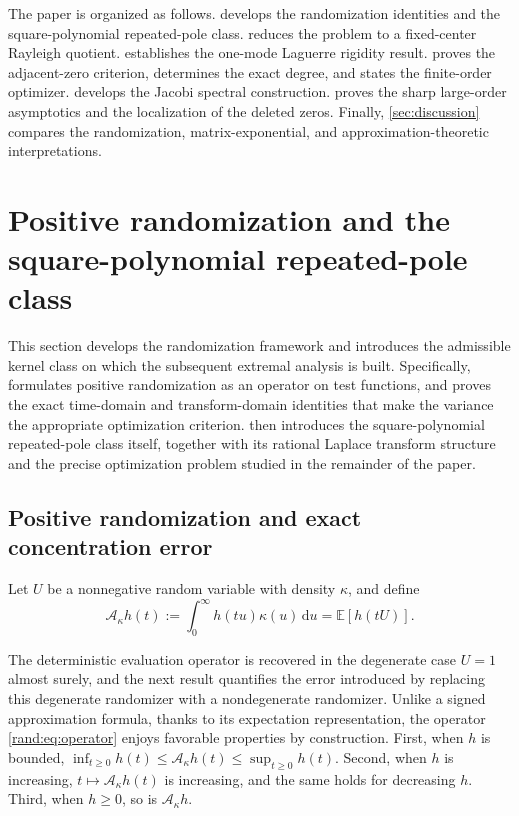 \documentclass[11pt]{article}
\numberwithin{equation}{section}
\theoremstyle{definition}
\theoremstyle{remark}
\newcommand{\E}{\mathbb E}
\newcommand{\dd}{\,\mathrm d}
\newcommand{\Aop}{\mathcal A}
\begin{document}
The paper is organized as follows.
 develops the randomization identities and the
square-polynomial repeated-pole class.
 reduces the problem to a fixed-center Rayleigh
quotient.
 establishes the one-mode Laguerre rigidity
result.
 proves the adjacent-zero criterion, determines the exact
degree, and states the finite-order optimizer.
 develops the Jacobi spectral construction.
 proves the sharp large-order asymptotics and the
localization of the deleted zeros.
Finally, \cref{sec:discussion} compares the randomization,
matrix-exponential, and approximation-theoretic interpretations.








\section{Positive randomization and the square-polynomial repeated-pole class}\label{sec:foundations}

This section develops the randomization framework and introduces the admissible kernel class on which the subsequent extremal analysis is built. Specifically,  formulates positive randomization as an
operator on test functions, and proves the exact time-domain and
transform-domain identities that make the variance the appropriate optimization
criterion.  then introduces the
square-polynomial repeated-pole class itself, together with its rational
Laplace transform structure and the precise optimization problem studied
in the remainder of the paper.

\subsection{Positive randomization and exact concentration error}
\label{sec:positive-kernels}

Let $U$ be a nonnegative random variable with density $\kappa$, and define
\begin{equation}\label{rand:eq:operator}
  \Aop_\kappa h(t)
  :=\int_0^\infty h(tu)\kappa(u)\dd u
  =\E[h(tU)].
\end{equation}

The deterministic evaluation operator is recovered in the degenerate case $U=1$ almost surely, and the next result quantifies the error introduced by replacing this degenerate randomizer with a nondegenerate randomizer. 
Unlike a signed approximation formula, thanks to its expectation representation, the operator \eqref{rand:eq:operator} enjoys favorable properties by construction. First, when $h$ is bounded,
$\inf_{t\geq0}h(t)\leq\Aop_\kappa h(t)\leq\sup_{t\geq0}h(t)$. Second, when $h$ is
increasing, $t\mapsto\Aop_\kappa h(t)$ is increasing, and the same holds for
decreasing $h$. Third, when $h\geq0$, so is $\Aop_\kappa h$.
\end{document}

